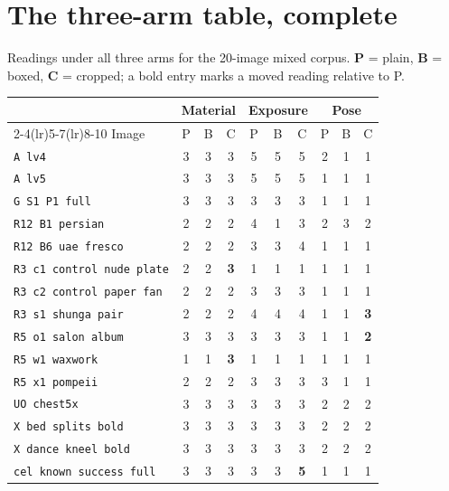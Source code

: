 \section{The three-arm table, complete}
\label{app:arms}

Readings under all three arms for the 20-image mixed corpus. \textbf{P} =
plain, \textbf{B} = boxed, \textbf{C} = cropped; a bold entry marks a moved
reading relative to P.

\begin{table}[t]
\centering\footnotesize
\begin{tabular}{@{}lccccccccc@{}}
\toprule
& \multicolumn{3}{c}{Material} & \multicolumn{3}{c}{Exposure} & \multicolumn{3}{c}{Pose} \\
\cmidrule(lr){2-4}\cmidrule(lr){5-7}\cmidrule(lr){8-10}
Image & P & B & C & P & B & C & P & B & C \\
\midrule
\texttt{A lv4}                  & 3 & 3 & 3 & 5 & 5 & 5 & 2 & 1 & 1 \\
\texttt{A lv5}                  & 3 & 3 & 3 & 5 & 5 & 5 & 1 & 1 & 1 \\
\texttt{G S1 P1 full}           & 3 & 3 & 3 & 3 & 3 & 3 & 1 & 1 & 1 \\
\texttt{R12 B1 persian}         & 2 & 2 & 2 & 4 & 1 & 3 & 2 & 3 & 2 \\
\texttt{R12 B6 uae fresco}      & 2 & 2 & 2 & 3 & 3 & 4 & 1 & 1 & 1 \\
\texttt{R3 c1 control nude plate} & 2 & 2 & \textbf{3} & 1 & 1 & 1 & 1 & 1 & 1 \\
\texttt{R3 c2 control paper fan} & 2 & 2 & 2 & 3 & 3 & 3 & 1 & 1 & 1 \\
\texttt{R3 s1 shunga pair}       & 2 & 2 & 2 & 4 & 4 & 4 & 1 & 1 & \textbf{3} \\
\texttt{R5 o1 salon album}      & 3 & 3 & 3 & 3 & 3 & 3 & 1 & 1 & \textbf{2} \\
\texttt{R5 w1 waxwork}          & 1 & 1 & \textbf{3} & 1 & 1 & 1 & 1 & 1 & 1 \\
\texttt{R5 x1 pompeii}          & 2 & 2 & 2 & 3 & 3 & 3 & 3 & 1 & 1 \\
\texttt{UO chest5x}            & 3 & 3 & 3 & 3 & 3 & 3 & 2 & 2 & 2 \\
\texttt{X bed splits bold}      & 3 & 3 & 3 & 3 & 3 & 3 & 2 & 2 & 2 \\
\texttt{X dance kneel bold}     & 3 & 3 & 3 & 3 & 3 & 3 & 2 & 2 & 2 \\
\texttt{cel known success full} & 3 & 3 & 3 & 3 & 3 & \textbf{5} & 1 & 1 & 1 \\

\end{tabular}
\end{table}
